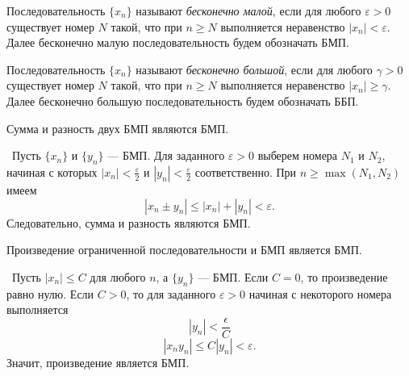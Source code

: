 \setcounter{section}{2}



\begin{definition}
    Последовательность \(\{x_{n}\}\) называют \textit{бесконечно малой},
    если для любого \(\varepsilon>0\) существует номер \(N\) такой, что
    при \(n\geq N\) выполняется неравенство \(|x_{n}|<\varepsilon\).
    Далее бесконечно малую последовательность будем обозначать БМП.
\end{definition}

\begin{definition}
    Последовательность \(\{x_{n}\}\) называют \textit{бесконечно большой},
    если для любого \(\gamma>0\) существует номер \(N\) такой, что при \(n\geq N\)
    выполняется неравенство \(|x_{n}|\geq\gamma\). Далее бесконечно большую
    последовательность будем обозначать ББП.
\end{definition}

\begin{theorem}
    Сумма и разность двух БМП являются БМП.

    \vspace{2mm}

    \proofname~Пусть \(\{x_{n}\}\) и \(\{y_{n}\}\) --- БМП. Для заданного
    \(\varepsilon>0\) выберем номера \(N_{1}\) и \(N_{2}\), начиная с
    которых \(|x_{n}|<\frac{\varepsilon}{2}\) и
    \(|y_{n}|<\frac{\varepsilon}{2}\) соответственно. При
    \(n\geq \max(N_{1},N_{2})\) имеем
    \[|x_{n}\pm y_{n}|\leq |x_{n}|+|y_{n}|<\varepsilon.\]
    Следовательно, сумма и разность являются БМП.~\qedsymbol
\end{theorem}

\begin{theorem}
    Произведение ограниченной последовательности и БМП является БМП.

    \vspace{2mm}

    \proofname~Пусть \(|x_{n}|\leq C\) для любого \(n\), а
    \(\{y_{n}\}\) --- БМП. Если \(C=0\), то произведение равно нулю.
    Если \(C>0\), то для заданного \(\varepsilon>0\) начиная с некоторого
    номера выполняется
    \[|y_{n}| < \frac{\epsilon}{C}\]
    \[|x_{n}y_{n}|\leq C|y_{n}|<\varepsilon.\]
    Значит, произведение является БМП.~\qedsymbol
\end{theorem}

